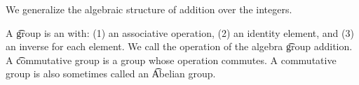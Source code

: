 

We generalize the algebraic structure of addition over the integers.


A \t{group} is an  with:
(1) an associative operation,
(2) an identity element, and
(3) an inverse for each element.
We call the operation of the algebra \t{group addition}.
A \t{commutative group} is a group whose operation commutes.
A commutative group is also sometimes called an \t{Abelian group}.
